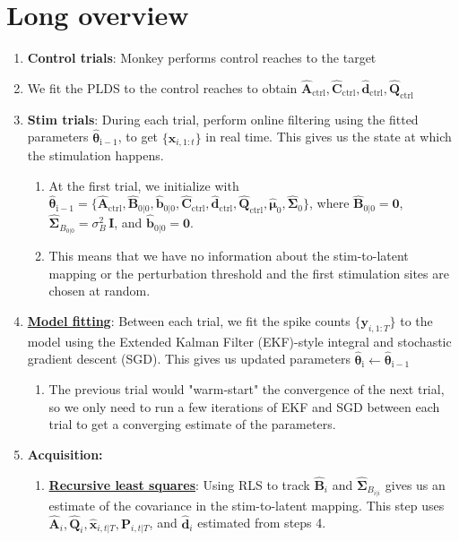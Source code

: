 \documentclass[11pt,letterpaper]{article} %
\begin{document}
\section*{Long overview}
\begin{enumerate}
    \item \textbf{Control trials}: Monkey performs control reaches to the target
    \item We fit the PLDS to the control reaches to obtain $\hat{\bm{A}}_{\mathrm{ctrl}}, \hat{\bm{C}}_{\mathrm{ctrl}}, \hat{\bm{d}}_{\mathrm{ctrl}}, \hat{\bm{Q}}_{\mathrm{ctrl}}$
    \item \textbf{Stim trials}: During each trial, perform online filtering using the fitted parameters $\hat{\bm{\theta}}_{\mathrm{i-1}}$,  to get $\{\bm{x}_{i,1:t}\}$ in real time. This gives us the state at which the stimulation happens.
    \begin{enumerate}
        \item At the first trial, we initialize with $\hat{\bm{\theta}}_{\mathrm{i-1}} = \{\hat{\bm{A}}_{\mathrm{ctrl}}, \hat{\bm{B}}_{0|0}, \hat{\bm{b}}_{0|0}, \hat{\bm{C}}_{\mathrm{ctrl}}, \hat{\bm{d}}_{\mathrm{ctrl}}, \hat{\bm{Q}}_{\mathrm{ctrl}}, \hat{\bm{\mu}}_{0}, \hat{\bm{\Sigma}}_{0}\}$, where $\hat{\bm{B}}_{0|0} = \bm{0}$, $\hat{\bm{\Sigma}}_{B_{0|0}} = \sigma_B^2\,\bm{I}$, and $\hat{\bm{b}}_{0|0} = \bm{0}$.
        \item This means that we have no information about the stim-to-latent mapping or the perturbation threshold and the first stimulation sites are chosen at random.
    \end{enumerate}
    \item \hyperref[sec:model_fitting]{\textbf{Model fitting}}: Between each trial, we fit the spike counts $\{\bm{y}_{i,1:T}\}$ to the model using the Extended Kalman Filter (EKF)-style integral and stochastic gradient descent (SGD). This gives us updated parameters $\hat{\bm{\theta}}_{\mathrm{i}} \leftarrow \hat{\bm{\theta}}_{\mathrm{i-1}}$
    \begin{enumerate}
        \item The previous trial would "warm-start" the convergence of the next trial, so we only need to run a few iterations of EKF and SGD between each trial to get a converging estimate of the parameters.
    \end{enumerate}
    \item \textbf{Acquisition:}
    \begin{enumerate}
        \item \hyperref[sec:RLS]{\textbf{Recursive least squares}}: Using RLS to track $\hat{\bm{B}}_i$ and $\boldsymbol{\hat\Sigma}_{B_{i|i}}$ gives us an estimate of the covariance in the stim-to-latent mapping. This step uses $\hat{\bm{A}}_i, \hat{\bm{Q}}_i, \hat{\bm{x}}_{i,t|T}, \bm{P}_{i,t|T}$, and $\hat{\bm{d}}_i$ estimated from  steps 4.

\end{enumerate}
\end{enumerate}
\end{document}
